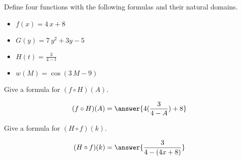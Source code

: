 \documentclass{ximera}
\author{Lee Wayand}
\begin{document}
\begin{exercise}




Define four functions with the following formulas and their natural domains. \\


\begin{itemize}
  \item $f(x) = 4 \, x + 8$
  \item $G(y) = 7 \, y^2 + 3 y - 5$
  \item $H(t) = \frac{3}{4 - t}$
  \item $w(M) = \cos(3 \, M - 9)$ 
\end{itemize}


\begin{question}


Give a formula for $(f \circ H)(A)$.

\[
(f \circ H)(A) = \answer{4 (\frac{3}{4 - A}) + 8}
\]

\end{question}






\begin{question}


Give a formula for $(H \circ f)(k)$.

\[
(H \circ f)(k) = \answer{\frac{3}{4 - (4x+8)}}
\]

\end{question}




\end{exercise}
\end{document}
